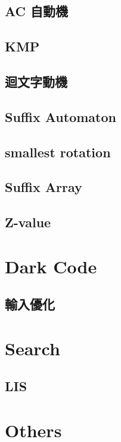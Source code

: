 \subsection{AC 自動機}

\subsection{KMP}

\subsection{迴文字動機}

\subsection{Suffix Automaton}

\subsection{smallest rotation}

\subsection{Suffix Array}

\subsection{Z-value}



\section{Dark Code}

\subsection{輸入優化}


\section{Search}
\subsection{LIS}



\section{Others}


